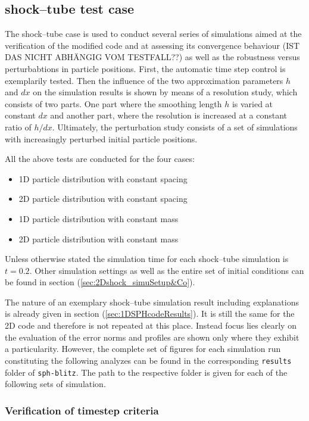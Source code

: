 \documentclass{report}
\begin{document}
\subsection{shock--tube test case}
\label{sec:2DSPHcodeResults_Shock}
The shock--tube case is used to conduct several series of simulations aimed at the verification of the modified code and at assessing its convergence behaviour (IST DAS NICHT ABHÄNGIG VOM TESTFALL??) as well as the robustness versus perturbabtions in particle positions. 
First, the automatic time step control is exemplarily tested. Then the influence of the two approximation parameters $h$ and $dx$ on the simulation results is shown by means of a resolution study, which consists of two parts. One part where the smoothing length $h$ is varied at constant $dx$ and another part, where the resolution is increased at a constant ratio of $h/dx$. Ultimately, the perturbation study consists of a set of simulations with increasingly perturbed initial particle positions.

All the above tests are conducted for the four cases:
\begin{itemize}
 \item 1D particle distribution with constant spacing
  \item 2D particle distribution with constant spacing
 \item 1D particle distribution with constant mass
  \item 2D particle distribution with constant mass
\end{itemize}

Unless otherwise stated the simulation time for each shock--tube simulation is $t=0.2$. Other simulation settings as well as the entire set of initial conditions can be found in section (\ref{sec:2Dshock_simuSetup&Co}).

The nature of an exemplary shock--tube simulation result including explanations is already given in section (\ref{sec:1DSPHcodeResults}). It is still the same for the 2D code and therefore is not repeated at this place. Instead focus lies clearly on the evaluation of the error norms and profiles are shown only where they exhibit a particularity. However, the complete set of figures for each simulation run constituting the following analyzes can be found in the corresponding {\tt results} folder of {\tt sph-blitz}. The path to the respective folder is given for each of the following sets of simulation.



\subsubsection{Verification of timestep criteria}
\end{document}
